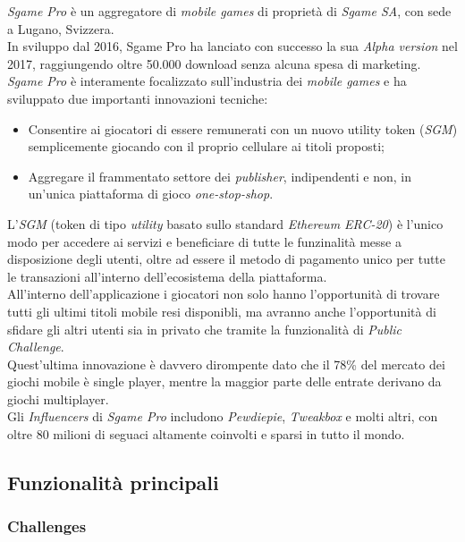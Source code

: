 \documentclass[11pt]{thesistemp}
\begin{document}
\textit{Sgame Pro} è un aggregatore di \textit{mobile games} di proprietà di \textit{Sgame SA}, con sede a Lugano, Svizzera.\\
In sviluppo dal 2016, Sgame Pro ha lanciato con successo la sua \textit{Alpha version} nel 2017, raggiungendo oltre 50.000 download senza alcuna spesa di marketing.\\
\textit{Sgame Pro} è interamente focalizzato sull'industria dei \textit{mobile games} e ha sviluppato due importanti innovazioni tecniche:
\begin{itemize}
	\item Consentire ai giocatori di essere remunerati con un nuovo utility token (\textit{SGM}) semplicemente giocando con il proprio cellulare ai titoli proposti;
	\item Aggregare il frammentato settore dei \textit{publisher}, indipendenti e non, in un'unica piattaforma di gioco \textit{one-stop-shop}.
\end{itemize}
 L'\textit{SGM} (token di tipo \textit{utility} basato sullo standard \textit{Ethereum ERC-20}) è l'unico modo per accedere ai servizi e beneficiare di tutte le funzinalità messe a disposizione degli utenti, oltre ad essere il metodo di pagamento unico per tutte le transazioni all'interno dell'ecosistema della piattaforma.\\
All'interno dell'applicazione i giocatori non solo hanno l'opportunità di trovare tutti gli ultimi titoli mobile resi disponibli, ma avranno anche l'opportunità di sfidare gli altri utenti sia in privato che tramite la funzionalità di \textit{Public Challenge}.\\
Quest'ultima innovazione è davvero dirompente dato che il 78\% del mercato dei giochi mobile è single player, mentre la maggior parte delle entrate derivano da giochi multiplayer.\\
Gli \textit{Influencers} di \textit{Sgame Pro} includono \textit{Pewdiepie}, \textit{Tweakbox} e molti altri, con oltre 80 milioni di seguaci altamente coinvolti e sparsi in tutto il mondo.\\ 

\subsection{Funzionalità principali}

\subsubsection{Challenges}
\end{document}
